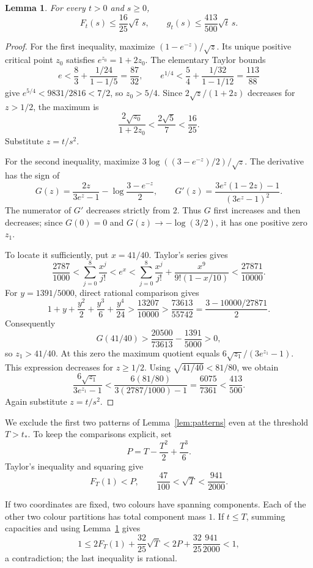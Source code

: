 \documentclass[11pt]{article}
\newtheorem{lemma}[theorem]{Lemma}
\begin{document}
\begin{lemma}\label{lem:capacity}
For every $t>0$ and $s\ge0$,
\[
 F_t(s)\le\frac{16}{25}\sqrt t\,s,
 \qquad
 g_t(s)\le\frac{413}{500}\sqrt t\,s.
\]
\end{lemma}
\begin{proof}
For the first inequality, maximize $(1-e^{-z})/\sqrt z$.
Its unique positive critical point $z_0$ satisfies $e^{z_0}=1+2z_0$.
The elementary Taylor bounds
\[
 e<\frac83+\frac{1/24}{1-1/5}=\frac{87}{32},
 \qquad
 e^{1/4}<\frac54+\frac{1/32}{1-1/12}=\frac{113}{88}
\]
give $e^{5/4}<9831/2816<7/2$, so $z_0>5/4$.
Since $2\sqrt z/(1+2z)$ decreases for $z>1/2$, the maximum is
\[
 \frac{2\sqrt{z_0}}{1+2z_0}<\frac{2\sqrt5}{7}<\frac{16}{25}.
\]
Substitute $z=t/s^2$.

For the second inequality, maximize
$3\log((3-e^{-z})/2)/\sqrt z$. The derivative has the sign of
\[
 G(z)=\frac{2z}{3e^z-1}-\log\frac{3-e^{-z}}2,
 \qquad
 G'(z)=\frac{3e^z(1-2z)-1}{(3e^z-1)^2}.
\]
The numerator of $G'$ decreases strictly from $2$. Thus $G$ first
increases and then decreases; since $G(0)=0$ and
$G(z)\to-\log(3/2)$, it has one positive zero $z_1$.

To locate it sufficiently, put $x=41/40$. Taylor's series gives
\[
 \frac{2787}{1000}
 <\sum_{j=0}^{8}\frac{x^j}{j!}
 <e^x
 <\sum_{j=0}^{8}\frac{x^j}{j!}
       +\frac{x^9}{9!(1-x/10)}
 <\frac{27871}{10000}.
\]
For $y=1391/5000$, direct rational comparison gives
\[
 1+y+\frac{y^2}{2}+\frac{y^3}{6}+\frac{y^4}{24}
 >\frac{13207}{10000}>\frac{73613}{55742}
 =\frac{3-10000/27871}{2}.
\]
Consequently
\[
 G(41/40)>\frac{20500}{73613}-\frac{1391}{5000}>0,
\]
so $z_1>41/40$. At this zero the maximum quotient equals
$6\sqrt{z_1}/(3e^{z_1}-1)$. This expression decreases for $z\ge1/2$.
Using $\sqrt{41/40}<81/80$, we obtain
\[
 \frac{6\sqrt{z_1}}{3e^{z_1}-1}
 <\frac{6(81/80)}{3(2787/1000)-1}
 =\frac{6075}{7361}<\frac{413}{500}.
\]
Again substitute $z=t/s^2$.
\end{proof}

We exclude the first two patterns of Lemma~\ref{lem:patterns} even at
the threshold $T>t_*$. To keep the comparisons explicit, set
\[
 P=T-\frac{T^2}{2}+\frac{T^3}{6}.
\]
Taylor's inequality and squaring give
\begin{equation}\label{eq:Tbounds}
 F_T(1)<P,\qquad \frac{47}{100}<\sqrt T<\frac{941}{2000}.
\end{equation}

If two coordinates are fixed, two colours have spanning components.
Each of the other two colour partitions has total component mass $1$.
If $t\le T$, summing capacities and using Lemma~\ref{lem:capacity} gives
\[
 1\le2F_T(1)+\frac{32}{25}\sqrt T
 <2P+\frac{32}{25}\frac{941}{2000}<1,
\]
a contradiction; the last inequality is rational.
\end{document}
